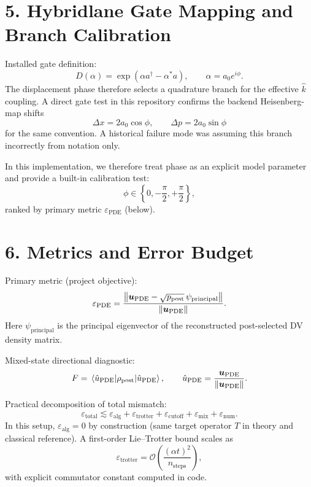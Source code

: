 \documentclass[11pt]{article}
\begin{document}
\section*{5. Hybridlane Gate Mapping and Branch Calibration}
Installed gate definition:
\begin{equation}
D(\alpha)=\exp(\alpha a^\dagger-\alpha^*a),\qquad \alpha=a_0e^{i\phi}.
\end{equation}
The displacement phase therefore selects a quadrature branch for the effective $\hat{k}$ coupling.
A direct gate test in this repository confirms the backend Heisenberg-map shifts
\begin{equation}
\Delta x = 2a_0\cos\phi,\qquad \Delta p = 2a_0\sin\phi
\end{equation}
for the same convention.
A historical failure mode was assuming this branch incorrectly from notation only.

In this implementation, we therefore treat phase as an explicit model parameter and provide a built-in calibration test:
\begin{equation}
\phi\in\left\{0,-\frac\pi2,+\frac\pi2\right\},
\end{equation}
ranked by primary metric $\varepsilon_{\mathrm{PDE}}$ (below).

\section*{6. Metrics and Error Budget}
Primary metric (project objective):
\begin{equation}
\varepsilon_{\mathrm{PDE}}=
\frac{\norm{\bm u_{\mathrm{PDE}}-\sqrt{p_{\mathrm{post}}}\,\psi_{\mathrm{principal}}}}{\norm{\bm u_{\mathrm{PDE}}}}.
\end{equation}
Here $\psi_{\mathrm{principal}}$ is the principal eigenvector of the reconstructed post-selected DV density matrix.

Mixed-state directional diagnostic:
\begin{equation}
F=\mel{\hat u_{\mathrm{PDE}}}{\rho_{\mathrm{post}}}{\hat u_{\mathrm{PDE}}},
\qquad \hat u_{\mathrm{PDE}}=\frac{\bm u_{\mathrm{PDE}}}{\norm{\bm u_{\mathrm{PDE}}}}.
\end{equation}

Practical decomposition of total mismatch:
\begin{equation}
\varepsilon_{\mathrm{total}}\lesssim
\varepsilon_{\mathrm{alg}}+\varepsilon_{\mathrm{trotter}}+\varepsilon_{\mathrm{cutoff}}+\varepsilon_{\mathrm{mix}}+\varepsilon_{\mathrm{num}}.
\end{equation}
In this setup, $\varepsilon_{\mathrm{alg}}=0$ by construction (same target operator $T$ in theory and classical reference).
A first-order Lie--Trotter bound scales as
\begin{equation}
\varepsilon_{\mathrm{trotter}}=\mathcal O\!\left(\frac{(\alpha t)^2}{n_{\text{steps}}}\right),
\end{equation}
with explicit commutator constant computed in code.
\end{document}
